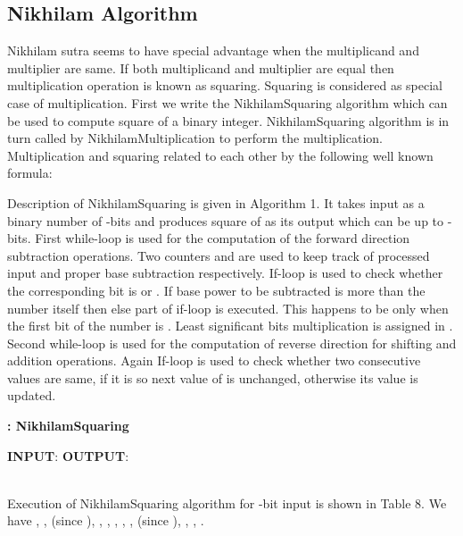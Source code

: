 \documentclass[conference]{IEEEtran}
\begin{document}
\subsection{Nikhilam Algorithm}
 Nikhilam sutra seems to have special advantage when the multiplicand and multiplier are same. If both multiplicand and multiplier are equal then multiplication operation is known as squaring. Squaring is considered as special case of multiplication. First we write the NikhilamSquaring algorithm which can be used to compute square of a binary integer. NikhilamSquaring algorithm is in turn called by NikhilamMultiplication to perform the multiplication. Multiplication and squaring related to each other by the following well known formula: 

\indent Description of NikhilamSquaring is given in Algorithm 1. It takes input  as a binary number of -bits and produces square of  as its output which can be up to -bits. First while-loop is used for the computation of the forward direction subtraction operations. Two counters  and  are used to keep track of processed input and proper base subtraction respectively. If-loop is used to check whether the corresponding bit is  or . If base power to be subtracted is more than the number itself then else part of if-loop is executed. This happens to be only when the first bit of the number is . Least significant bits multiplication is assigned in . Second while-loop is used for the computation of reverse direction for shifting and addition operations. Again If-loop is used to check whether two consecutive  values are same, if it is so next value of  is unchanged, otherwise its value is updated.   

\begin{algorithm}
\caption{\bf :  NikhilamSquaring }
\begin{algorithmic}
\STATE \textbf{INPUT}: 
\STATE \textbf{OUTPUT}: 
   \STATE  
   \STATE 
   {
   \IF {}
   \STATE  \\
   \ELSE \STATE 
   \ENDIF
   \STATE 
   }
   \ENDWHILE
   \STATE 
   \STATE 
   {
   \IF {}
   \STATE  \\
   \ELSE \STATE 
   \ENDIF
   \STATE 
   }
   \ENDWHILE

   \RETURN 
\end{algorithmic}
\end{algorithm}

Execution of NikhilamSquaring algorithm for -bit input  is shown in Table 8. We have , ,  (since ), , , , , ,  (since ), , ,  .
\end{document}
